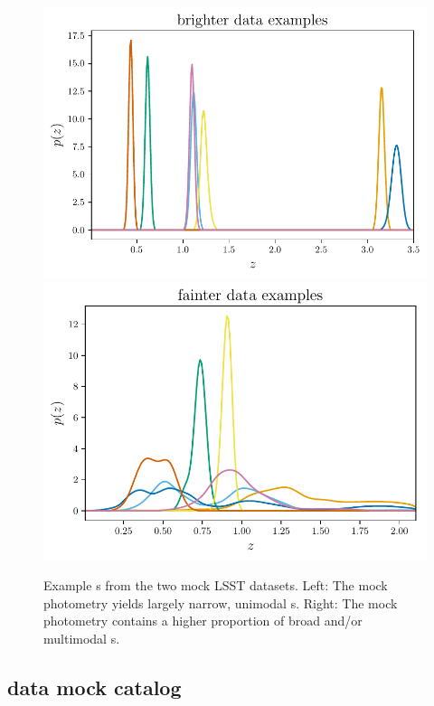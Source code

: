 \begin{figure}
	\begin{center}
		\includegraphics[width=\columnwidth]{figures/qp/graham_pzs.pdf}
		\includegraphics[width=\columnwidth]{figures/qp/schmidt_pzs.pdf}
		\caption{
			Example \pz s from the two mock LSST datasets.
			Left: The \mgdata mock photometry yields largely narrow, unimodal \pz s.
			Right: The \ssdata mock photometry contains a higher proportion of broad 
			and/or multimodal \pz s.
			}
	\end{center}
\end{figure}

\subsection{\Mgdata data mock catalog}

